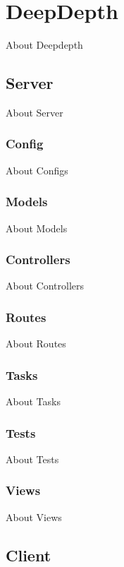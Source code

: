 \documentclass[a4paper,11pt]{report}
\begin{document}
\chapter{DeepDepth}

About Deepdepth

\section{Server}

About Server

\subsection{Config}

About Configs

\subsection{Models}

About Models

\subsection{Controllers}

About Controllers

\subsection{Routes}

About Routes

\subsection{Tasks}

About Tasks

\subsection{Tests}

About Tests

\subsection{Views}

About Views

\section{Client}
\end{document}
